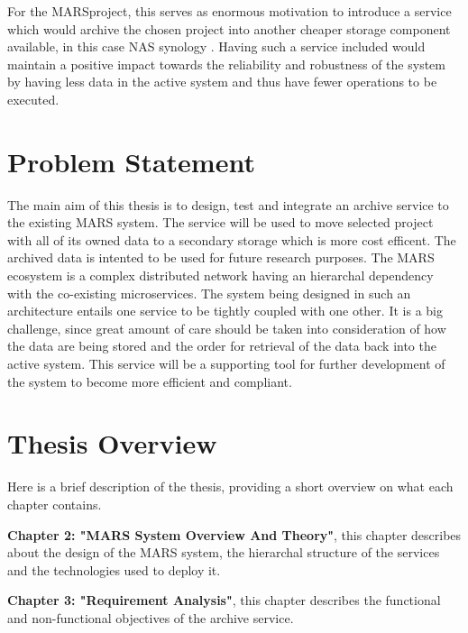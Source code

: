    For the MARS\footnotemark[\value{footnote}] project, this serves as enormous
    motivation to introduce a service which would archive the chosen project
    into another cheaper storage component available, in this case NAS synology 
    \cite{Synology}. Having such a service included would maintain a positive impact 
    towards the reliability and robustness of the system by having less data in the 
    active system and thus have fewer operations to be executed.
    


    \section{Problem Statement}

    The main aim of this thesis is to design, test and integrate an archive service
    to the existing MARS system. The service will be used to move selected project with all of its
    owned data to a secondary storage which is more cost efficent. The archived data is intented 
    to be used for future research purposes.
    The MARS ecosystem is a complex distributed network having an
    hierarchal dependency with the co-existing microservices. The system being designed
    in such an architecture entails one service to be tightly coupled with one other. It is 
    a big challenge, since great amount of care should be taken into consideration of how the 
    data are being stored and the order for retrieval of the data back into the active system.
    This service will be a supporting tool for further development of the system to become more 
    efficient and compliant. 

    \section{Thesis Overview}
        Here is a brief description of the thesis, providing a short overview on what each
        chapter contains.
        
        \par
        \textbf{Chapter 2: "MARS System Overview And Theory"}, this chapter describes about the design
        of the MARS system, the hierarchal structure of the services and the technologies used to
        deploy it.

        \par
        \textbf{Chapter 3: "Requirement Analysis"}, this chapter describes the functional and
        non-functional objectives of the archive service.

